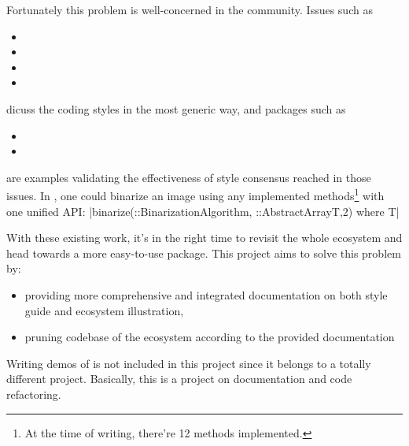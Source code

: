Fortunately this problem is well-concerned in the community. Issues such as
\begin{itemize}
    \item {}
    \item {}
    \item {}
    \item {}
\end{itemize}
dicuss the coding styles in the most generic way, and packages such as
\begin{itemize}
    \item \repohistogramthresholding
    \item \repoimagebinarization
\end{itemize}
are examples validating the effectiveness of style consensus reached in those issues. In \imagebinarization, one could binarize an image using any implemented methods\footnote{At the time of writing, there're 12 methods implemented.} with one unified API: |binarize(::BinarizationAlgorithm, ::AbstractArray{T,2}) where {T}|

With these existing work, it's in the right time to revisit the whole \images{} ecosystem and head towards a more easy-to-use \images{} package. This project aims to solve this problem by:

\begin{itemize}
    \item providing more comprehensive and integrated documentation on both style guide and ecosystem illustration,
    \item pruning codebase of the ecosystem according to the provided documentation
\end{itemize}

Writing demos of \images{} is not included in this project since it belongs to a totally different project. Basically, this is a project on documentation and code refactoring.
